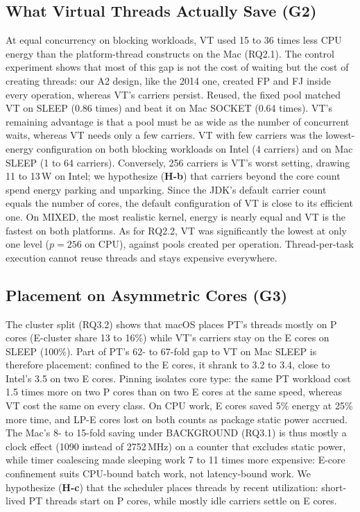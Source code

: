 \subsection{What Virtual Threads Actually Save (G2)}
At equal concurrency on blocking workloads, VT used 15 to 36 times less CPU energy than the platform-thread constructs on the Mac (RQ2.1). The control experiment shows that most of this gap is not the cost of waiting but the cost of creating threads: our A2 design, like the 2014 one, created FP and FJ inside every operation, whereas VT's carriers persist. Reused, the fixed pool matched VT on SLEEP (0.86 times) and beat it on Mac SOCKET (0.64 times). VT's remaining advantage is that a pool must be as wide as the number of concurrent waits, whereas VT needs only a few carriers. VT with few carriers was the lowest-energy configuration on both blocking workloads on Intel (4 carriers) and on Mac SLEEP (1 to 64 carriers). Conversely, 256 carriers is VT's worst setting, drawing 11 to 13\,W on Intel; we hypothesize (\textbf{H-b}) that carriers beyond the core count spend energy parking and unparking. Since the JDK's default carrier count equals the number of cores, the default configuration of VT is close to its efficient one. On MIXED, the most realistic kernel, energy is nearly equal and VT is the fastest on both platforms. As for RQ2.2, VT was significantly the lowest at only one level ($p = 256$ on CPU), against pools created per operation. Thread-per-task execution cannot reuse threads and stays expensive everywhere.

\subsection{Placement on Asymmetric Cores (G3)}
The cluster split (RQ3.2) shows that macOS places PT's threads mostly on P cores (E-cluster share 13 to 16\%) while VT's carriers stay on the E cores on SLEEP (100\%). Part of PT's 62- to 67-fold gap to VT on Mac SLEEP is therefore placement: confined to the E cores, it shrank to 3.2 to 3.4, close to Intel's 3.5 on two E cores. Pinning isolates core type: the same PT workload cost 1.5 times more on two P cores than on two E cores at the same speed, whereas VT cost the same on every class. On CPU work, E cores saved 5\% energy at 25\% more time, and LP-E cores lost on both counts as package static power accrued. The Mac's 8- to 15-fold saving under BACKGROUND (RQ3.1) is thus mostly a clock effect (1090 instead of 2752\,MHz) on a counter that excludes static power, while timer coalescing made sleeping work 7 to 11 times more expensive: E-core confinement suits CPU-bound batch work, not latency-bound work. We hypothesize (\textbf{H-c}) that the scheduler places threads by recent utilization: short-lived PT threads start on P cores, while mostly idle carriers settle on E cores.

